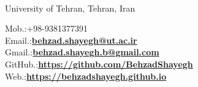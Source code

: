 \documentclass[]{rahulworld-resume}
\begin{document}
	

\begin{minipage}[t]{0.40\textwidth} 
\vspace{10pt}
\begin{large}
	\\
\end{large}
\vspace{5pt}
University of Tehran, Tehran, Iran
\end{minipage} 
\hfill
\begin{minipage}[t]{0.35\textwidth} 
\vspace{20pt}
Mob.:\hfill +98-9381377391 \\
Email.:\hfill\textbf{\href{mailto:behzad.shayegh@ut.ac.ir}{behzad.shayegh@ut.ac.ir}} \\
Gmail.:\hfill\textbf{\href{mailto:behzad.shayegh.b@gmail.com}{behzad.shayegh.b@gmail.com}} \\
GitHub.:\hfill\textbf{\href{https://github.com/BehzadShayegh}{https://github.com/BehzadShayegh}} 
Web.:\hfill\textbf{\href{https://behzadshayegh.github.io}{https://behzadshayegh.github.io}} 
\end{minipage} 
\vspace{10pt}

%
%
\end{document}
